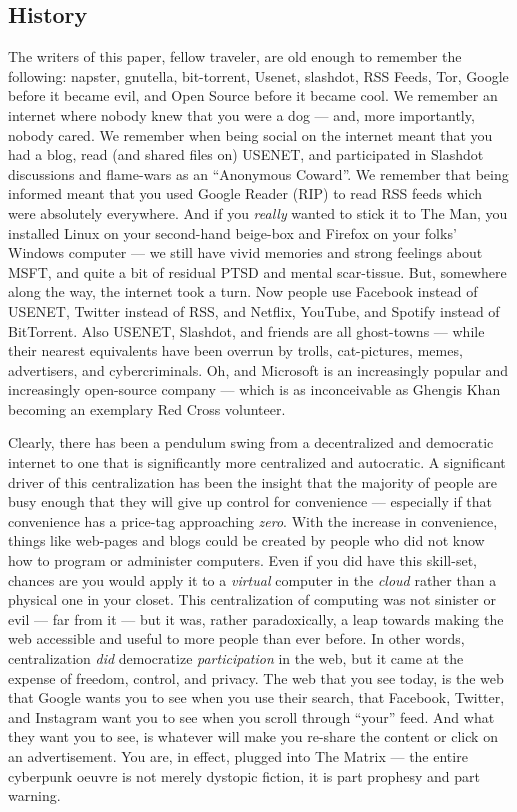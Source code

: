 \documentclass[a4paper]{article}
\begin{document}
\subsection{History}
The writers of this paper, fellow traveler, are old enough to remember
the following: napster, gnutella, bit-torrent, Usenet, slashdot, RSS
Feeds, Tor, Google before it became evil, and Open Source before it
became cool. We remember an internet where nobody knew that you were a
dog --- and, more importantly, nobody cared. We remember when being
social on the internet meant that you had a blog, read (and shared files
on) USENET, and participated in Slashdot discussions and flame-wars as
an ``Anonymous Coward''. We remember that being informed meant that you
used Google Reader (RIP) to read RSS feeds which were absolutely
everywhere. And if you \emph{really} wanted to stick it to The Man,
you installed Linux on your second-hand beige-box and Firefox on your
folks' Windows computer --- we still have vivid memories and strong
feelings about MSFT, and quite a bit of residual PTSD and mental
scar-tissue. But, somewhere along the way, the internet took a turn. Now
people use Facebook instead of USENET, Twitter instead of RSS, and
Netflix, YouTube, and Spotify instead of BitTorrent. Also USENET,
Slashdot, and friends are all ghost-towns --- while their nearest
equivalents have been overrun by trolls, cat-pictures, memes,
advertisers, and cybercriminals. Oh, and Microsoft is an increasingly
popular and increasingly open-source company --- which is as
inconceivable as Ghengis Khan becoming an exemplary Red Cross volunteer.


Clearly, there has been a pendulum swing from a decentralized and
democratic internet to one that is significantly more centralized and
autocratic. A significant driver of this centralization has been the
insight that the majority of people are busy enough that they will give
up control for convenience --- especially if that convenience has a
price-tag approaching \emph{zero}. With the increase in convenience,
things like web-pages and blogs could be created by people who did not
know how to program or administer computers. Even if you did have this
skill-set, chances are you would apply it to a \emph{virtual} computer
in the \emph{cloud} rather than a physical one in your closet. This
centralization of computing was not sinister or evil --- far from it ---
but it was, rather paradoxically, a leap towards making the web
accessible and useful to more people than ever before. In other words,
centralization \emph{did} democratize \emph{participation} in the
web, but it came at the expense of freedom, control, and privacy. The
web that you see today, is the web that Google wants you to see when you
use their search, that Facebook, Twitter, and Instagram want you to see
when you scroll through ``your'' feed. And what they want you to see, is
whatever will make you re-share the content or click on an
advertisement. You are, in effect, plugged into The Matrix --- the
entire cyberpunk oeuvre is not merely dystopic fiction, it is part
prophesy and part warning.
\end{document}
